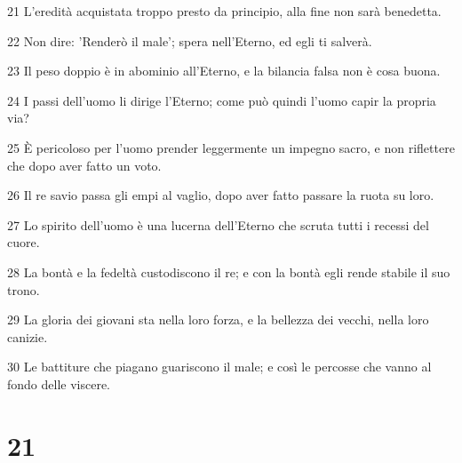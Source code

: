 \par 21 L'eredità acquistata troppo presto da principio, alla fine non sarà benedetta.
\par 22 Non dire: 'Renderò il male'; spera nell'Eterno, ed egli ti salverà.
\par 23 Il peso doppio è in abominio all'Eterno, e la bilancia falsa non è cosa buona.
\par 24 I passi dell'uomo li dirige l'Eterno; come può quindi l'uomo capir la propria via?
\par 25 È pericoloso per l'uomo prender leggermente un impegno sacro, e non riflettere che dopo aver fatto un voto.
\par 26 Il re savio passa gli empi al vaglio, dopo aver fatto passare la ruota su loro.
\par 27 Lo spirito dell'uomo è una lucerna dell'Eterno che scruta tutti i recessi del cuore.
\par 28 La bontà e la fedeltà custodiscono il re; e con la bontà egli rende stabile il suo trono.
\par 29 La gloria dei giovani sta nella loro forza, e la bellezza dei vecchi, nella loro canizie.
\par 30 Le battiture che piagano guariscono il male; e così le percosse che vanno al fondo delle viscere.

\chapter{21}

